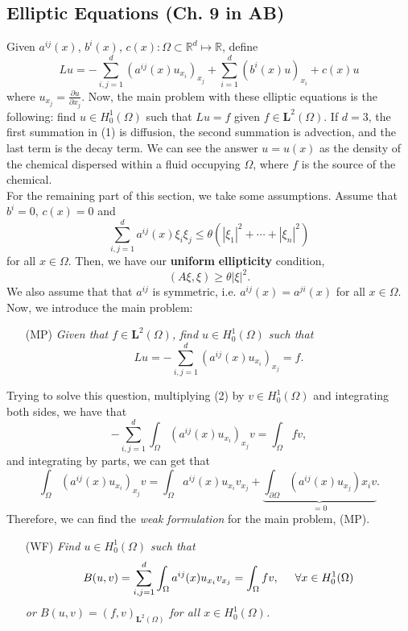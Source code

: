 \documentclass[12pt]{article}
\newcommand{\R}{{\mathbb R}}
\newcommand{\p}{\partial}
\newcommand{\Om}{\Omega}
\newcommand{\dint}{\displaystyle\int}
\newcommand{\dintom}{\dint_{\Om}}
\newcommand{\ml}{\mathbf{L}}
\newcommand{\sbs}{\subset}
\newcommand{\bi}{b^i}
\newcommand{\sumijd}{\sum\limits_{i, j = 1}^{d}}
\newcommand{\sumid}{\sum\limits_{i = 1}^{d}}
\newcommand{\aij}{a^{ij}}
\newcommand{\Hzo}{H_0^1(\Om)}
\newcommand{\mlto}{\ml^2(\Om)}
\begin{document}
\subsection*{Elliptic Equations (Ch. 9 in AB)}
Given $\aij(x)$, $\bi(x)$, $c(x) : \Om \sbs \R^d \mapsto \R$, define 
\begin{equation}
 Lu = - \sumijd (\aij(x) u_{x_i})_{x_j} + \sumid (\bi(x) u )_{x_i} + c(x) u
 \end{equation}
where $u_{x_j} = \frac{\p u}{\p x_j}$. Now, the main problem with these elliptic equations is the following: find $u \in \Hzo$ such that $Lu = f$ given $f \in \mlto$. If $d = 3$, the first summation in (1) is diffusion, the second summation is advection, and the last term is the decay term. We can see the answer $u = u(x)$ as the density of the chemical dispersed within a fluid occupying $\Om$, where $f$ is the source of the chemical. \\
\indent For the remaining part of this section, we take some assumptions. Assume that $\bi = 0$, $c(x) = 0$ and 
\[ \sumijd \aij(x) \xi_i \xi_j \leq \theta \left( |\xi_1|^2 + \cdots + |\xi_n|^2 \right)\]
for all $x \in \Om$. Then, we have our \textbf{uniform} \textbf{ellipticity} condition, 
\[ (A \xi, \xi) \geq \theta |\xi|^2.\]
We also assume that that $a^{ij}$ is symmetric, i.e. $\aij(x) = a^{ji}(x)$ for all $x \in \Om$. Now, we introduce the main problem:
\begin{enumerate}[topsep=-15pt]
\item[(MP)] \textit{Given that $f \in \mlto$, find $u \in \Hzo$ such that }
\begin{equation}
Lu  =  - \sumijd (\aij(x) u_{x_i} )_{x_j} = f.
\end{equation}
\end{enumerate}
Trying to solve this question, multiplying (2) by $v \in \Hzo$ and integrating both sides, we have that 
\[ - \sumijd \dintom (\aij(x) u_{x_i})_{x_j} v = \dintom fv,\]
and integrating by parts, we can get that 
\[\dintom (\aij(x) u_{x_i})_{x_j} v  = \dintom \aij(x) u_{x_i} v_{x_j} + \underbrace{\dint_{\p \Omega} (\aij(x) u_{x_j}){x_i} v}_{ = 0}. \]
Therefore, we can find the \textit{weak formulation} for the main problem, (MP).
 \begin{enumerate}[topsep=-15pt]
\item[(WF)] \textit{Find $u \in \Hzo$ such that}
\[ B(u, v) = \sumijd \dintom \aij (x) u_{x_i} v_{x_j} = \dintom fv, \hspace{5mm} \forall x \in \Hzo\]
\textit{or $B(u, v) = (f, v)_{\mlto}$ for all $x \in \Hzo$.}
\end{enumerate}
\end{document}
